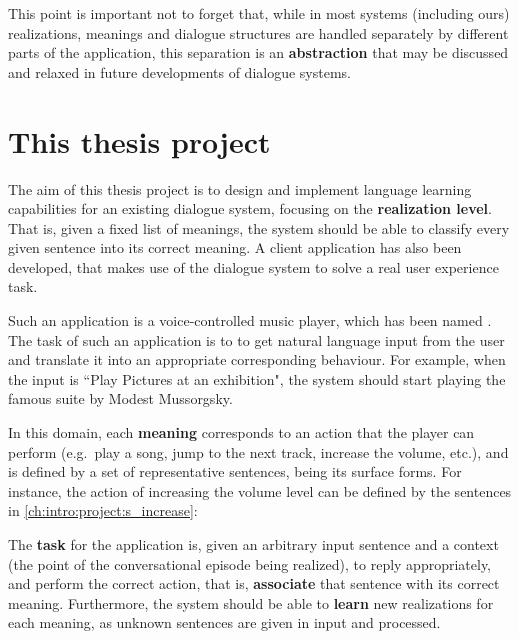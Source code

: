 This point is important not to forget that, while in most systems (including ours) realizations, meanings and dialogue structures are handled separately by different parts of the application, this separation is an \textbf{abstraction} that may be discussed and relaxed in future developments of dialogue systems.


\section{This thesis project} \label{ch:intro:project}

The aim of this thesis project is to design and implement language learning capabilities for an existing dialogue system, focusing on the \textbf{realization level}. That is, given a fixed list of meanings, the system should be able to classify every given sentence into its correct meaning. A client application has also been developed, that makes use of the dialogue system to solve a real user experience task.

Such an application is a voice-controlled music player, which has been named \textbf{\pname}. The task of such an application is to to get natural language input from the user and translate it into an appropriate corresponding behaviour. For example, when the input is ``Play Pictures at an exhibition", the system should start playing the famous suite by Modest Mussorgsky.

In this domain, each \textbf{meaning} corresponds to an action that the player can perform (e.g.\ play a song, jump to the next track, increase the volume, etc.), and is defined by a set of representative sentences, being its surface forms. For instance, the action of increasing the volume level can be defined by the sentences in \ref{ch:intro:project:s_increase}:
 \label{ch:intro:project:s_increase}

The \textbf{task} for the application is, given an arbitrary input sentence and a context (the point of the conversational episode being realized), to reply appropriately, and perform the correct action, that is, \textbf{associate} that sentence with its correct meaning. Furthermore, the system should be able to \textbf{learn} new realizations for each meaning, as unknown sentences are given in input and processed.

